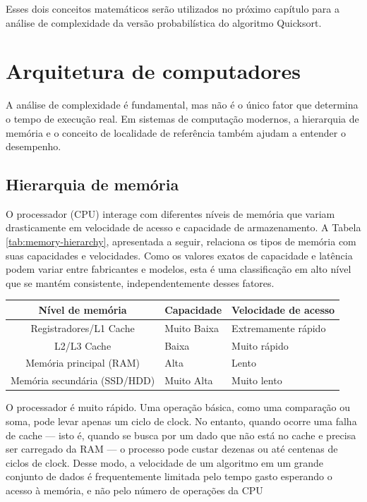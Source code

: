 Esses dois conceitos matemáticos serão utilizados no próximo capítulo para a análise de complexidade da versão probabilística do algoritmo Quicksort.

\section{Arquitetura de computadores}
A análise de complexidade  é fundamental, mas não é o único fator que determina o tempo de execução real. Em sistemas de computação modernos, a hierarquia de memória e o conceito de localidade de referência também ajudam a entender o desempenho.

\subsection{Hierarquia de memória} O processador (CPU) interage com diferentes níveis de memória que variam drasticamente em velocidade de acesso e capacidade de armazenamento. A Tabela \ref{tab:memory-hierarchy}, apresentada a seguir, relaciona os tipos de memória com suas capacidades e velocidades. Como os valores exatos de capacidade e latência podem variar entre fabricantes e modelos, esta é uma classificação em alto nível que se mantém consistente, independentemente desses fatores.

\begin{table}[!h]
    \centering
    \begin{tabular}{ | c | l | l |  }
    \hline
    Nível de memória             & Capacidade  & Velocidade de acesso\\
    \hline
    Registradores/L1 Cache       & Muito Baixa & Extremamente rápido \\
    L2/L3 Cache                  & Baixa       & Muito rápido        \\
    Memória principal (RAM)      & Alta        & Lento               \\
    Memória secundária (SSD/HDD) & Muito Alta  & Muito lento         \\
    \hline
    \end{tabular}
\end{table}

O processador é muito rápido. Uma operação básica, como uma comparação ou soma, pode levar apenas um ciclo de clock. No entanto, quando ocorre uma falha de cache — isto é, quando se busca por um dado que não está no cache e precisa ser carregado da RAM — o processo pode custar dezenas ou até centenas de ciclos de clock. Desse modo, a velocidade de um algoritmo em um grande conjunto de dados é frequentemente limitada pelo tempo gasto esperando o acesso à memória, e não pelo número de operações da CPU


